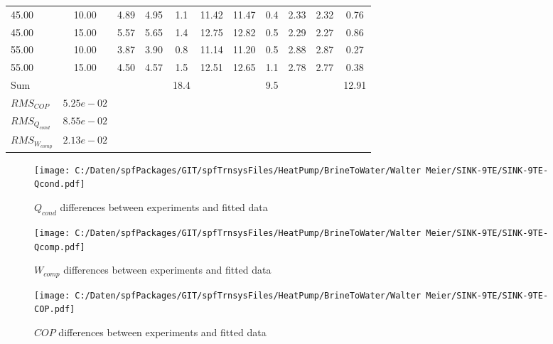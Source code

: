 \documentclass[english]{SPFShortReport}
\begin{document}
\begin{table}[!ht]
\begin{small}
\begin{center}
{\begin{tabular}{l | c c c c c c c c c c }
45.00  & 10.00 & 4.89 & 4.95 & 1.1 & 11.42 & 11.47 & 0.4 & 2.33 & 2.32 & 0.76\\ 
45.00  & 15.00 & 5.57 & 5.65 & 1.4 & 12.75 & 12.82 & 0.5 & 2.29 & 2.27 & 0.86\\ 
55.00  & 10.00 & 3.87 & 3.90 & 0.8 & 11.14 & 11.20 & 0.5 & 2.88 & 2.87 & 0.27\\ 
55.00  & 15.00 & 4.50 & 4.57 & 1.5 & 12.51 & 12.65 & 1.1 & 2.78 & 2.77 & 0.38\\ 
\hline 
 Sum &  & &  & 18.4 &  &  & 9.5 & &  & 12.91\\ 
\hline 
 $RMS_{COP}$ & $5.25e-02$ \\ 
 $RMS_{Q_{cond}}$ & $8.55e-02$ \\ 
 $RMS_{W_{comp}}$ & $2.13e-02$ \\ 
\hline
\hline
\end{tabular}
}
\label{ErrorsTable}
\end{center}
\end{small}
\end{table}
\begin{figure}[!ht]
\begin{center}
\texttt{[image: C:/Daten/spfPackages/GIT/spfTrnsysFiles/HeatPump/BrineToWater/Walter Meier/SINK-9TE/SINK-9TE-Qcond.pdf]}
\caption{$Q_{cond}$ differences between experiments and fitted data}
\label{QcongFig}
\end{center}
\end{figure}
\begin{figure}[!ht]
\begin{center}
\texttt{[image: C:/Daten/spfPackages/GIT/spfTrnsysFiles/HeatPump/BrineToWater/Walter Meier/SINK-9TE/SINK-9TE-Qcomp.pdf]}
\caption{$W_{comp}$ differences between experiments and fitted data}
\label{QcompFig}
\end{center}
\end{figure}
\begin{figure}[!ht]
\begin{center}
\texttt{[image: C:/Daten/spfPackages/GIT/spfTrnsysFiles/HeatPump/BrineToWater/Walter Meier/SINK-9TE/SINK-9TE-COP.pdf]}
\caption{$COP$ differences between experiments and fitted data}
\label{COPFig}
\end{center}
\end{figure}
\end{document}
